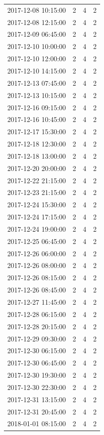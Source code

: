 \begin{tabular}{lrrr}
2017-12-08 10:15:00 & 2 & 4 & 2 \\
2017-12-08 12:15:00 & 2 & 4 & 2 \\
2017-12-09 06:45:00 & 2 & 4 & 2 \\
2017-12-10 10:00:00 & 2 & 4 & 2 \\
2017-12-10 12:00:00 & 2 & 4 & 2 \\
2017-12-10 14:15:00 & 2 & 4 & 2 \\
2017-12-13 07:45:00 & 2 & 4 & 2 \\
2017-12-13 10:15:00 & 2 & 4 & 2 \\
2017-12-16 09:15:00 & 2 & 4 & 2 \\
2017-12-16 10:45:00 & 2 & 4 & 2 \\
2017-12-17 15:30:00 & 2 & 4 & 2 \\
2017-12-18 12:30:00 & 2 & 4 & 2 \\
2017-12-18 13:00:00 & 2 & 4 & 2 \\
2017-12-20 20:00:00 & 2 & 4 & 2 \\
2017-12-22 21:15:00 & 2 & 4 & 2 \\
2017-12-23 21:15:00 & 2 & 4 & 2 \\
2017-12-24 15:30:00 & 2 & 4 & 2 \\
2017-12-24 17:15:00 & 2 & 4 & 2 \\
2017-12-24 19:00:00 & 2 & 4 & 2 \\
2017-12-25 06:45:00 & 2 & 4 & 2 \\
2017-12-26 06:00:00 & 2 & 4 & 2 \\
2017-12-26 08:00:00 & 2 & 4 & 2 \\
2017-12-26 08:15:00 & 2 & 4 & 2 \\
2017-12-26 08:45:00 & 2 & 4 & 2 \\
2017-12-27 11:45:00 & 2 & 4 & 2 \\
2017-12-28 06:15:00 & 2 & 4 & 2 \\
2017-12-28 20:15:00 & 2 & 4 & 2 \\
2017-12-29 09:30:00 & 2 & 4 & 2 \\
2017-12-30 06:15:00 & 2 & 4 & 2 \\
2017-12-30 06:45:00 & 2 & 4 & 2 \\
2017-12-30 19:30:00 & 2 & 4 & 2 \\
2017-12-30 22:30:00 & 2 & 4 & 2 \\
2017-12-31 13:15:00 & 2 & 4 & 2 \\
2017-12-31 20:45:00 & 2 & 4 & 2 \\
2018-01-01 08:15:00 & 2 & 4 & 2 \\

\end{tabular}
